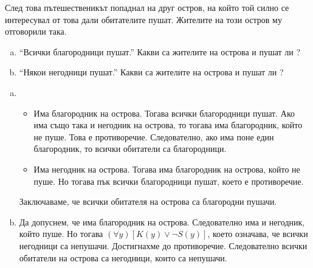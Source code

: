 \begin{problem}
  След това пътешественикът попаднал на друг остров, на който
  той силно се интересувал от това дали обитателите пушат.
  Жителите на този остров му отговорили така.
  \begin{enumerate}[a)]
  \item
    ``Всички благородници пушат.''
    Какви са жителите на острова и пушат ли ?
  \item
    ``Някои негодници пушат.''
    Какви са жителите на острова и пушат ли ?
  \end{enumerate}
\end{problem}
\begin{solution}
  \begin{enumerate}[a)]
  \item 
    \begin{itemize}
    \item 
      Има благородник на острова. Тогава всички благородници пушат.
      Ако има също така и негодник на острова, то тогава има благородник, който не пуше.
      Това е  противоречие. Следователно, ако има поне един благородник, то всички обитатели са благородници.
    \item
      Има негодник на острова. Тогава има благородник на острова, който не пуше.
      Но тогава пък всички благородници пушат, което е противоречие.
    \end{itemize}
    Заключаваме, че всички обитателя на острова са благородни пушачи.
  \item
    Да допуснем, че има благородник на острова. Следователно има и негодник, който пуше.
    Но тогава $(\forall y)[K(y) \vee \neg S(y)]$, което означава, че
    всички негодници са непушачи. Достигнахме до противоречие.
    Следователно всички обитатели на острова са негодници, които са непушачи.
  \end{enumerate}
\end{solution}

